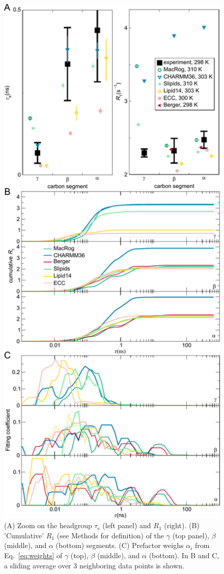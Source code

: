 \documentclass[journal=jcisd8,manuscript=article,layout=twocolumn]{achemso}
\begin{document}
\begin{figure}[!h]
\centering
\includegraphics[width=\columnwidth]{../Figs/R1_and_comp.pdf}
\caption{
(A) Zoom on the headgroup $\tau_\mathrm e$ (left panel) and $R_1$ (right).
(B) 'Cumulative' $R_1$ (see Methods for definition) of the
$\gamma$ (top panel), $\beta$ (middle), and $\alpha$ (bottom) segments.
(C) Prefactor weighs $\alpha_i$ from Eq.~\eqref{eq:weights} of $\gamma$ (top), $\beta$ (middle), and $\alpha$ (bottom).
In B and C, a sliding average over 3 neighboring data points is shown.
}
\label{fig:cumulativeR1s}
\end{figure}
\end{document}
